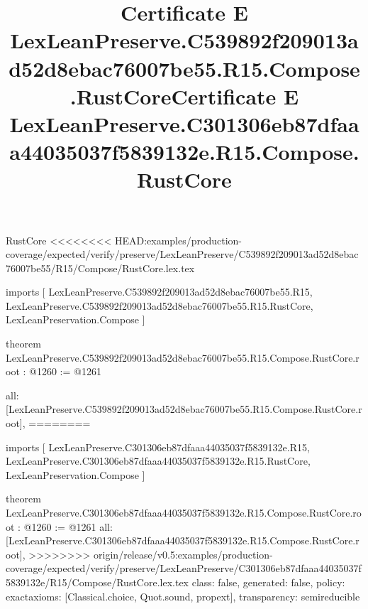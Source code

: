\begin{lexlean}{RustCore}
<<<<<<<< HEAD:examples/production-coverage/expected/verify/preserve/LexLeanPreserve/C539892f209013ad52d8ebac76007be55/R15/Compose/RustCore.lex.tex
\title{Certificate E LexLeanPreserve.C539892f209013ad52d8ebac76007be55.R15.Compose.RustCore}
\begin{coremodule}
imports [
  LexLeanPreserve.C539892f209013ad52d8ebac76007be55.R15,
  LexLeanPreserve.C539892f209013ad52d8ebac76007be55.R15.RustCore,
  LexLeanPreservation.Compose
]

theorem LexLeanPreserve.C539892f209013ad52d8ebac76007be55.R15.Compose.RustCore.root : @1260 := @1261 {
  all: [LexLeanPreserve.C539892f209013ad52d8ebac76007be55.R15.Compose.RustCore.root],
========
\title{Certificate E LexLeanPreserve.C301306eb87dfaaa44035037f5839132e.R15.Compose.RustCore}
\begin{coremodule}
imports [
  LexLeanPreserve.C301306eb87dfaaa44035037f5839132e.R15,
  LexLeanPreserve.C301306eb87dfaaa44035037f5839132e.R15.RustCore,
  LexLeanPreservation.Compose
]

theorem LexLeanPreserve.C301306eb87dfaaa44035037f5839132e.R15.Compose.RustCore.root : @1260 := @1261 {
  all: [LexLeanPreserve.C301306eb87dfaaa44035037f5839132e.R15.Compose.RustCore.root],
>>>>>>>> origin/release/v0.5:examples/production-coverage/expected/verify/preserve/LexLeanPreserve/C301306eb87dfaaa44035037f5839132e/R15/Compose/RustCore.lex.tex
  class: false,
  generated: false,
  policy: exact{axioms: [Classical.choice, Quot.sound, propext]},
  transparency: semireducible
}


\end{coremodule}}
\end{coremodule}
\end{lexlean}
